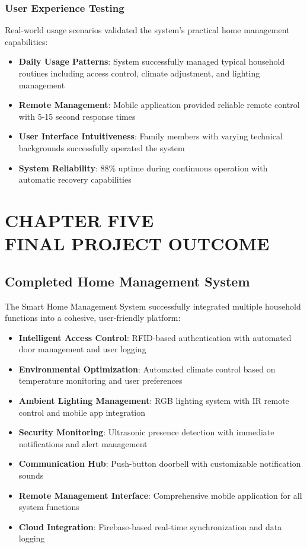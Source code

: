 \documentclass[12pt,a4paper]{report}
\begin{document}
\subsection{User Experience Testing}
\noindent Real-world usage scenarios validated the system's practical home management capabilities:

\begin{itemize}
\item \textbf{Daily Usage Patterns}: System successfully managed typical household routines including access control, climate adjustment, and lighting management
\item \textbf{Remote Management}: Mobile application provided reliable remote control with 5-15 second response times
\item \textbf{User Interface Intuitiveness}: Family members with varying technical backgrounds successfully operated the system
\item \textbf{System Reliability}: 88\% uptime during continuous operation with automatic recovery capabilities
\end{itemize}

\chapter[CHAPTER FIVE FINAL PROJECT OUTCOME]{CHAPTER FIVE\\FINAL PROJECT OUTCOME}

\section{Completed Home Management System}

\noindent The Smart Home Management System successfully integrated multiple household functions into a cohesive, user-friendly platform:

\begin{itemize}
\item \textbf{Intelligent Access Control}: RFID-based authentication with automated door management and user logging
\item \textbf{Environmental Optimization}: Automated climate control based on temperature monitoring and user preferences
\item \textbf{Ambient Lighting Management}: RGB lighting system with IR remote control and mobile app integration
\item \textbf{Security Monitoring}: Ultrasonic presence detection with immediate notifications and alert management
\item \textbf{Communication Hub}: Push-button doorbell with customizable notification sounds
\item \textbf{Remote Management Interface}: Comprehensive mobile application for all system functions
\item \textbf{Cloud Integration}: Firebase-based real-time synchronization and data logging
\end{itemize}
\end{document}
